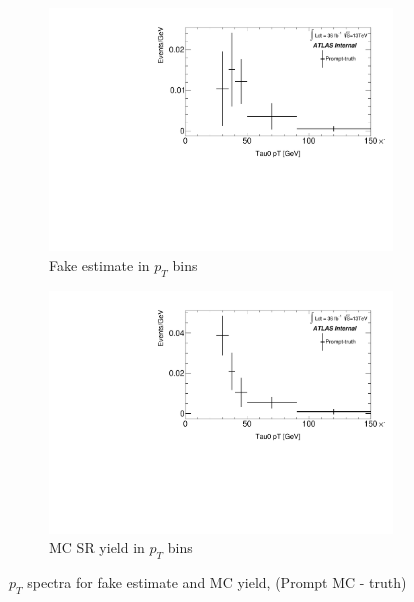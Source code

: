 \documentclass[11pt]{article}
\begin{document}
	\begin{figure}[H]
	\centering
	\begin{subfigure}{.5\textwidth}
	\centering
	\includegraphics[width=0.95\linewidth]{figures/FakesEstimate_data_pp8_nonallhad_new_scaledHists/hist_FakeEstimate_Prompt-truth.pdf}
  	\caption{Fake estimate in $p_T$ bins}
  	\label{fig:sub1}
	\end{subfigure}%
	\begin{subfigure}{.5\textwidth}
	\centering
	\includegraphics[width=0.95\linewidth]{figures/FakesEstimate_data_pp8_nonallhad_new_scaledHists/hist_SRMC_Prompt-truth.pdf}
	\caption{MC SR yield in $p_T$ bins}
	\end{subfigure}
	\caption{$p_T$ spectra for fake estimate and MC yield, (Prompt MC - truth)}
	\end{figure}
\end{document}
